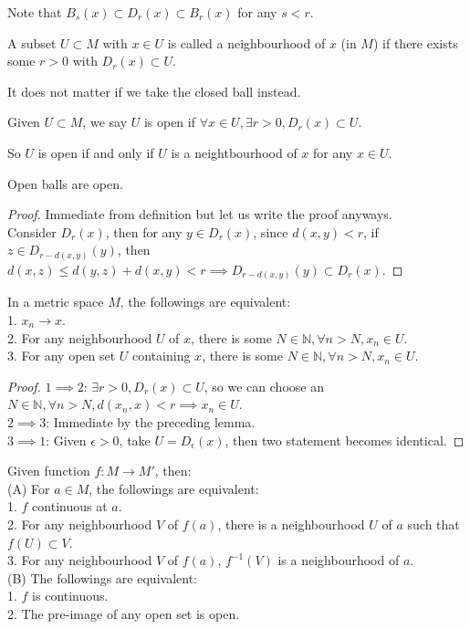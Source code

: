 Note that $B_s(x)\subset D_r(x)\subset B_r(x)$ for any $s<r$.
\begin{definition}
    A subset $U\subset M$ with $x\in U$ is called a neighbourhood of $x$ (in $M$) if there exists some $r>0$ with $D_r(x)\subset U$.
\end{definition}
It does not matter if we take the closed ball instead.
\begin{definition}
    Given $U\subset M$, we say $U$ is open if $\forall x\in U, \exists r>0, D_r(x)\subset U$.
\end{definition}
So $U$ is open if and only if $U$ is a neightbourhood of $x$ for any $x\in U$.
\begin{lemma}
    Open balls are open.
\end{lemma}
\begin{proof}
    Immediate from definition but let us write the proof anyways.\\
    Consider $D_r(x)$, then for any $y\in D_r(x)$, since $d(x,y)<r$, if $z\in D_{r-d(x,y)}(y)$, then $d(x,z)\le d(y,z)+d(x,y)<r\implies D_{r-d(x,y)}(y)\subset D_r(x)$.
\end{proof}
\begin{proposition}\label{metric_nbhdconv}
    In a metric space $M$, the followings are equivalent:\\
    1. $x_n\to x$.\\
    2. For any neighbourhood $U$ of $x$, there is some $N\in\mathbb N, \forall n>N, x_n\in U$.\\
    3. For any open set $U$ containing $x$, there is some $N\in\mathbb N, \forall n>N, x_n\in U$.
\end{proposition}
\begin{proof}
    $1\implies 2$: $\exists r>0,D_r(x)\subset U$, so we can choose an $N\in\mathbb N,\forall n>N, d(x_n,x)<r\implies x_n\in U$.\\
    $2\implies 3$: Immediate by the preceding lemma.\\
    $3\implies 1$: Given $\epsilon>0$, take $U=D_\epsilon(x)$, then two statement becomes identical.
\end{proof}
\begin{proposition}\label{metric_preimage}
    Given function $f:M\to M'$, then:\\
    (A) For $a\in M$, the followings are equivalent:\\
    1. $f$ continuous at $a$.\\
    2. For any neighbourhood $V$ of $f(a)$, there is a neighbourhood $U$ of $a$ such that $f(U)\subset V$.\\
    3. For any neighbourhood $V$ of $f(a)$, $f^{-1}(V)$ is a neighbourhood of $a$.\\
    (B) The followings are equivalent:\\
    1. $f$ is continuous.\\
    2. The pre-image of any open set is open.
\end{proposition}
